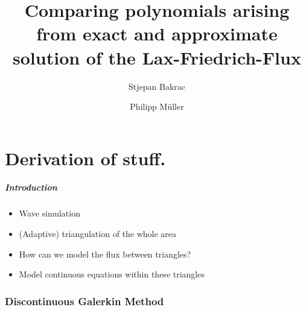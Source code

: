 \documentclass{beamer}
\title{Comparing polynomials arising from exact and approximate solution of the Lax-Friedrich-Flux}
\author{Stjepan Bakrac \and Philipp Müller}
\date{}
\begin{document}
\part{Derivation of stuff.}
\label{part:introduction}

\begin{frame}
  \frametitle{Introduction}
  \begin{itemize}
  \item Wave simulation
  \item (Adaptive) triangulation of the whole area
  \item How can we model the flux between triangles?
  \item Model continuous equations within these triangles
  \end{itemize}
\end{frame}

\section{Discontinuous Galerkin Method}
\label{sec:basis-functions-intro}
\end{document}
